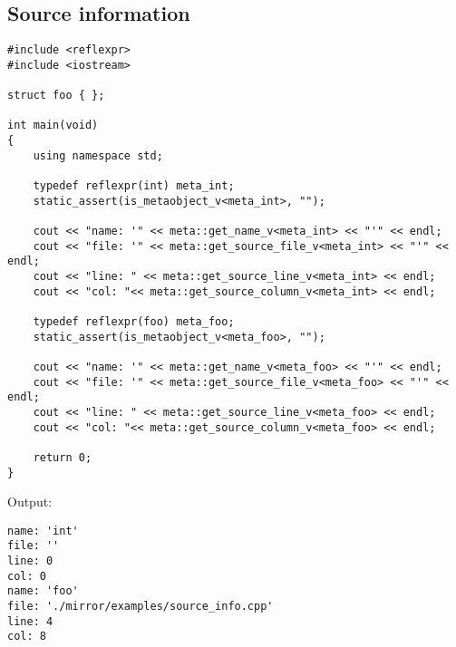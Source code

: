 \subsection{Source information}

\begin{verbatim}
#include <reflexpr>
#include <iostream>

struct foo { };

int main(void)
{
	using namespace std;

	typedef reflexpr(int) meta_int;
	static_assert(is_metaobject_v<meta_int>, "");

	cout << "name: '" << meta::get_name_v<meta_int> << "'" << endl;
	cout << "file: '" << meta::get_source_file_v<meta_int> << "'" << endl;
	cout << "line: " << meta::get_source_line_v<meta_int> << endl;
	cout << "col: "<< meta::get_source_column_v<meta_int> << endl;

	typedef reflexpr(foo) meta_foo;
	static_assert(is_metaobject_v<meta_foo>, "");

	cout << "name: '" << meta::get_name_v<meta_foo> << "'" << endl;
	cout << "file: '" << meta::get_source_file_v<meta_foo> << "'" << endl;
	cout << "line: " << meta::get_source_line_v<meta_foo> << endl;
	cout << "col: "<< meta::get_source_column_v<meta_foo> << endl;

	return 0;
}
\end{verbatim}

Output:

\begin{verbatim}
name: 'int'
file: ''
line: 0
col: 0
name: 'foo'
file: './mirror/examples/source_info.cpp'
line: 4
col: 8
\end{verbatim}

